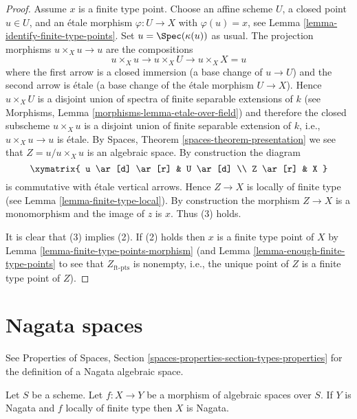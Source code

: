 \begin{proof}
Assume $x$ is a finite type point. Choose an affine scheme $U$,
a closed point $u \in U$, and an \'etale morphism $\varphi : U \to X$
with $\varphi(u) = x$, see
Lemma \ref{lemma-identify-finite-type-points}.
Set $u = \Spec(\kappa(u))$ as usual. The projection morphisms
$u \times_X u \to u$ are the compositions
$$
u \times_X u \to u \times_X U \to u \times_X X = u
$$
where the first arrow is a closed immersion (a base change of
$u \to U$) and the second arrow is \'etale (a base change of the \'etale
morphism $U \to X$). Hence $u \times_X U$ is a disjoint union of spectra
of finite separable extensions of $k$ (see
Morphisms, Lemma \ref{morphisms-lemma-etale-over-field})
and therefore the closed subscheme $u \times_X u$ is a disjoint union of
finite separable extension of $k$, i.e., $u \times_X u \to u$ is \'etale. By
Spaces, Theorem \ref{spaces-theorem-presentation}
we see that $Z = u/u \times_X u$ is an algebraic space. By construction
the diagram
$$
\xymatrix{
u \ar[d] \ar[r] & U \ar[d] \\
Z \ar[r] & X
}
$$
is commutative with \'etale vertical arrows. Hence $Z \to X$ is locally
of finite type (see
Lemma \ref{lemma-finite-type-local}).
By construction the morphism $Z \to X$ is a monomorphism and
the image of $z$ is $x$. Thus (3) holds.

\medskip\noindent
It is clear that (3) implies (2).
If (2) holds then $x$ is a finite type point of $X$ by
Lemma \ref{lemma-finite-type-points-morphism}
(and
Lemma \ref{lemma-enough-finite-type-points}
to see that $Z_{\text{ft-pts}}$ is nonempty, i.e., the unique point of
$Z$ is a finite type point of $Z$).
\end{proof}





\section{Nagata spaces}
\label{section-nagata}

\noindent
See Properties of Spaces, Section
\ref{spaces-properties-section-types-properties} for the definition
of a Nagata algebraic space.

\begin{lemma}
\label{lemma-finite-type-nagata}
Let $S$ be a scheme.
Let $f : X \to Y$ be a morphism of algebraic spaces over $S$.
If $Y$ is Nagata and $f$ locally of finite type then $X$ is Nagata.
\end{lemma}

